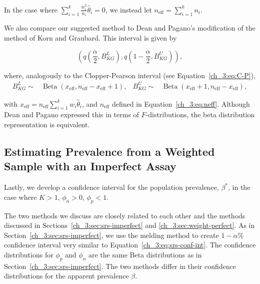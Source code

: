 In the case where \( \sum_{i=1}^k \frac{w_i^2}{n_i}\hat{\theta}_i = 0 \), we instead let \( n_{\text{eff}} = \sum_{i=1}^k n_i \).

We also compare our suggested method to Dean and Pagano's modification of the method of Korn and Graubard.\cite{Korn:1998,Dean:2015}
This interval is given by

\begin{equation}
    \left( q \left( \frac{\alpha}{2}, B^L_{KG} \right), q \left( 1 - \frac{\alpha}{2}, B^U_{KG} \right) \right),
\end{equation}

where, analogously to the Clopper-Pearson interval (see Equation~\ref{ch_3:eq:C-P}),
\begin{align*}
    B^L_{KG} \sim& \operatorname{Beta}\left(x_{\text{eff}}, n_{\text{eff}} - x_{\text{eff}} + 1 \right), &
    B^U_{KG} \sim& \operatorname{Beta}\left(x_{\text{eff}} + 1, n_{\text{eff}} - x_{\text{eff}} \right),
\end{align*}

with \( x_{\text{eff}} = n_{\text{eff}} \sum_{i=1}^k w_i \hat{\theta}_i \), and \( n_{\text{eff}} \) defined in Equation~\ref{ch_3:eq:neff}.
Although Dean and Pagano\cite{Dean:2015} expressed this in terms of \(F\)-distributions, the beta distribution representation is equivalent.

\subsection{Estimating Prevalence from a Weighted Sample with an Imperfect Assay}
\label{ch_3:sec:weight-imperfect}

Lastly, we develop a confidence interval for the population prevalence, \( \beta^* \), in the case where \( K > 1 \), \( \phi_n > 0 \), \( \phi_p < 1 \).

The two methods we discuss are closely related to each other and the methods discussed in Sections~\ref{ch_3:sec:srs-imperfect} and \ref{ch_3:sec:weight-perfect}.
As in Section~\ref{ch_3:sec:srs-imperfect}, we use the melding method\cite{FayP:2015} to create \( 1 - \alpha \)\% confidence interval very similar to Equation~\ref{ch_3:eq:srs-conf-int}.
The confidence distributions for \( \phi_p \) and \( \phi_n \) are the same Beta distributions as in Section~\ref{ch_3:sec:srs-imperfect}.
The two methods differ in their confidence distributions for the apparent prevalence \( \beta \).


